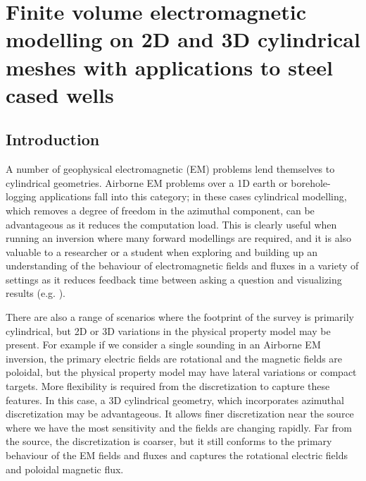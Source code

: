 
\chapter{Finite volume electromagnetic modelling on 2D and 3D cylindrical meshes with applications to steel cased wells}
\label{ch:modelling_steel_cased_wells}


\section{Introduction}
\label{sec:intro}

A number of geophysical electromagnetic (EM) problems lend themselves to cylindrical geometries. Airborne EM problems over a 1D earth or borehole-logging applications fall into this category; in these cases cylindrical modelling, which removes a degree of freedom in the azimuthal component, can be advantageous as it reduces the computation load. This is clearly useful when running an inversion where many forward modellings are required, and it  is also valuable to a researcher or a student when exploring and building up an understanding of the behaviour of electromagnetic fields and fluxes in a variety of settings as it reduces feedback time between asking a question and visualizing results (e.g. \cite{Oldenburg2017}).

There are also a range of scenarios where the footprint of the survey is primarily cylindrical, but 2D or 3D variations in the physical property model may be present. For example if we consider a single sounding in an Airborne EM inversion, the primary electric fields are rotational and the magnetic fields are poloidal, but the physical property model may have lateral variations or compact targets. More flexibility is required from the discretization to capture these features. In this case, a 3D cylindrical geometry, which incorporates azimuthal discretization may be advantageous. It allows finer discretization near the source where we have the most sensitivity and the fields are changing rapidly. Far from the source, the discretization is coarser, but it still conforms to the primary behaviour of the EM fields and fluxes and captures the rotational electric fields and poloidal magnetic flux.

